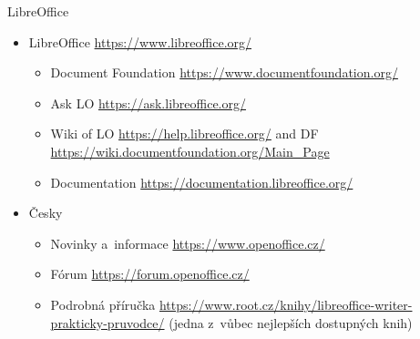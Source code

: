 \documentclass[compress, xelatex, 11pt, xcolor=svgnames, aspectratio=169, url={hyphens, lowtilde}]{beamer}
\begin{document}
\begin{frame}{LibreOffice}
	\begin{itemize}
		\item LibreOffice \url{https://www.libreoffice.org/}
		\begin{itemize}
			\item Document Foundation \url{https://www.documentfoundation.org/}
			\item Ask LO \url{https://ask.libreoffice.org/}
			\item Wiki of LO \url{https://help.libreoffice.org/} and DF \url{https://wiki.documentfoundation.org/Main_Page}
			\item Documentation \url{https://documentation.libreoffice.org/}
		\end{itemize}
		\item Česky
		\begin{itemize}
			\item Novinky a~informace \url{https://www.openoffice.cz/}
			\item Fórum \url{https://forum.openoffice.cz/}
			\item Podrobná příručka \url{https://www.root.cz/knihy/libreoffice-writer-prakticky-pruvodce/} (jedna z~vůbec nejlepších dostupných knih)
		\end{itemize}
	\end{itemize}
\end{frame}
\end{document}
